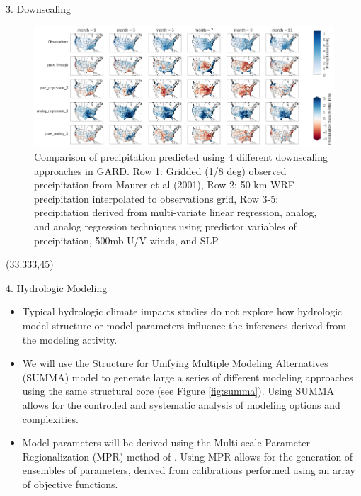 \documentclass{beamer}
\begin{document}
\begin{frame}{}
\begin{columns}
\begin{column}{.3333\paperwidth}
\begin{textblock}{\textwidth \TPHorizModule}
\begin{block}{3. Downscaling}
\begin{itemize}
     \end{itemize}

     \begin{figure}
      \center\includegraphics[width=0.95\linewidth]{figures/downscaling.png}
      \caption{Comparison of precipitation predicted using 4 different downscaling approaches in GARD. Row 1: Gridded (1/8 deg) observed precipitation from Maurer et al (2001), Row 2: 50-km WRF precipitation interpolated to observations grid, Row 3-5: precipitation derived from multi-variate linear regression, analog, and analog regression techniques using predictor variables of precipitation, 500mb U/V winds, and SLP.}
      \label{fig:downscaling}
     \end{figure}

    \end{block}

   \end{textblock}



   \begin{textblock}{\textwidth \TPHorizModule}(33.333,45)
    \begin{block}{4. Hydrologic Modeling}

        \begin{itemize}
         \justifying
         \item Typical hydrologic climate impacts studies do not explore how hydrologic model structure or model parameters influence the inferences derived from the modeling activity.
         \item We will use the Structure for Unifying Multiple Modeling Alternatives (SUMMA) model \citep{Clark_2015} to generate large a series of different modeling approaches using the same structural core (see Figure \ref{fig:summa}). Using SUMMA allows for the controlled and systematic analysis of modeling options and complexities.
         \item Model parameters will be derived using the Multi-scale Parameter Regionalization (MPR) method of \citet{Samaniego_2010}. Using MPR allows for the generation of ensembles of parameters, derived from calibrations performed using an array of objective functions.
        \end{itemize}


\end{block}
\end{textblock}
\end{column}
\end{columns}
\end{frame}
\end{document}

